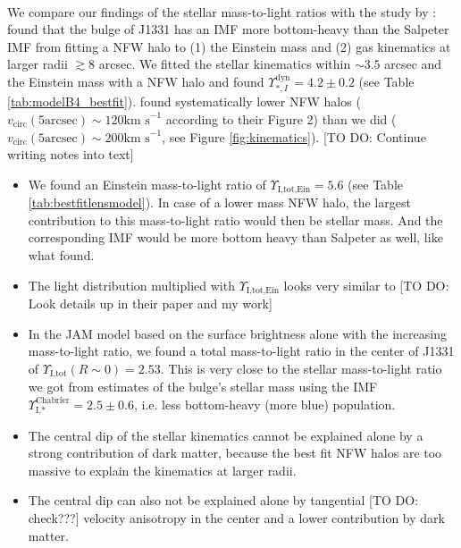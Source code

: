 \\We compare our findings of the stellar mass-to-light ratios with the study by \cite{SWELLSV}: \cite{SWELLSV} found that the bulge of J1331 has an IMF more bottom-heavy than the Salpeter IMF from fitting a NFW halo to (1) the Einstein mass and (2) gas kinematics at larger radii $\gtrsim 8$ arcsec. We fitted the stellar kinematics within $\sim 3.5$ arcsec and the Einstein mass with a NFW halo and found $\Upsilon^\text{dyn}_{*,I} = 4.2 \pm 0.2$ (see Table \ref{tab:modelB4_bestfit}). \cite{SWELLSV}  found systematically lower NFW halos ($v_\text{circ}(5\text{arcsec}) \sim 120 \text{km s}^{-1}$ according to their Figure 2) than we did ($v_\text{circ}(5\text{arcsec}) \sim 200 \text{km s}^{-1}$, see Figure \ref{fig:kinematics}). [TO DO: Continue writing notes into text]
\begin{itemize}
\item We found an Einstein mass-to-light ratio of $\Upsilon_\text{I,tot,Ein} = 5.6$ (see Table \ref{tab:bestfitlensmodel}). In case of a lower mass NFW halo, the largest contribution to this mass-to-light ratio would then be stellar mass. And the corresponding IMF would be more bottom heavy than Salpeter as well, like what \citet{SWELLSV} found.
\item The light distribution multiplied with $\Upsilon_\text{I,tot,Ein}$ looks very similar to \cite{SWELLSV} [TO DO: Look details up in their paper and my work]
\item In the JAM model based on the surface brightness alone with the increasing mass-to-light ratio, we found a total mass-to-light ratio in the center of J1331 of  $\Upsilon_\text{I,tot}(R\sim0) = 2.53$. This is very close to the stellar mass-to-light ratio we got from \citet{SWELLSI} estimates of the bulge's stellar mass using the \citet{Chabrier2003} IMF $\Upsilon_\text{I,*}^\text{Chabrier} = 2.5 \pm 0.6$, i.e. less bottom-heavy (more blue) population.
\item The central dip of the stellar kinematics cannot be explained alone by a strong contribution of dark matter, because the best fit NFW halos are too massive to explain the kinematics at larger radii.
\item The central dip can also not be explained alone by tangential [TO DO: check???] velocity anisotropy in the center and a lower contribution by dark matter.

\end{itemize}
